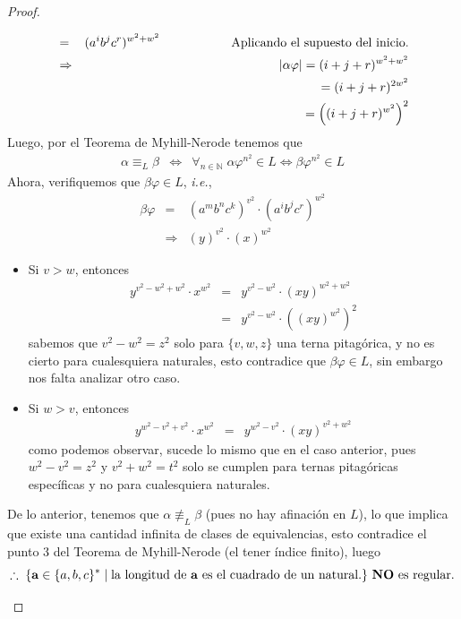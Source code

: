 \documentclass{article}
\begin{document}
\begin{enumerate}
\begin{proof}
\begin{itemize}
\begin{eqnarray*}
        &=& (a^{i}b^{j}c^{r})^{w^2 + w^2}
        \hspace*{2cm} \text{Aplicando el supuesto del inicio.}\\
        &\Rightarrow& |\alpha \varphi| = (i + j + r)^{w^2 + w^2}\\
        & & \hspace*{0.75cm} = (i + j + r)^{2w^2}\\
        & & \hspace*{0.75cm} = \left((i + j + r)^{w^2}\right)^{2}
      \end{eqnarray*}
      Luego, por el Teorema de Myhill-Nerode tenemos que
      \begin{eqnarray*}
      \alpha \equiv_{L} \beta &\Leftrightarrow& \forall_{n \in \mathbb{N}}\; \alpha \varphi^{n^2} \in L
      \Leftrightarrow \beta \varphi^{n^2} \in L
      \end{eqnarray*}
      Ahora, verifiquemos que $\beta \varphi \in L$, \textit{i.e.},
      \begin{eqnarray*}
        \beta \varphi &=& (a^{m}b^{n}c^{k})^{v^2} \cdot (a^{i}b^{j}c^{r})^{w^2}\\
        &\Rightarrow& (y)^{v^2} \cdot (x)^{w^2} 
      \end{eqnarray*}
      \begin{itemize}
      \item Si $v > w$, entonces
        \begin{eqnarray*}
          y^{v^2 - w^2 + w^2} \cdot x^{w^2} &=& y^{v^2 - w^2} \cdot (xy)^{w^2 + w^2}\\
          &=& y^{v^2 - w^2} \cdot \left((xy)^{w^2}\right)^2
        \end{eqnarray*}
        sabemos que $v^2 - w^2 = z^2$ solo para $\{v,w,z\}$ una terna pitagórica, y no es
        cierto para cualesquiera naturales, esto contradice que $\beta \varphi \in L$, sin
        embargo nos falta analizar otro caso.
      \item Si $w > v$, entonces
        \begin{eqnarray*}
          y^{w^2 - v^2 + v^2} \cdot x^{w^2} &=& y^{w^2 - v^2} \cdot (xy)^{v^2 + w^2}
        \end{eqnarray*}
        como podemos observar, sucede lo mismo que en el caso anterior, pues
        $w^2 - v^2 = z^2$ y $v^2 + w^2 = t^2$ solo se cumplen para ternas pitagóricas específicas
        y no para cualesquiera naturales.
      \end{itemize}
      De lo anterior, tenemos que $\alpha \not \equiv_{L} \beta$ (pues no hay afinación en $L$),
      lo que implica que existe una cantidad infinita de clases de equivalencias, esto contradice
      el punto $3$ del Teorema de Myhill-Nerode (el tener índice finito), luego
      \[
      \therefore\; \{\mathbf{a} \in \{a, b, c\}^{*}\; |\; \text{la longitud de $\mathbf{a}$
        es el cuadrado de un natural.}\} \text{ \textbf{NO} es regular}.
      \]
    \end{itemize}
    

\end{proof}
\end{enumerate}
\end{document}
